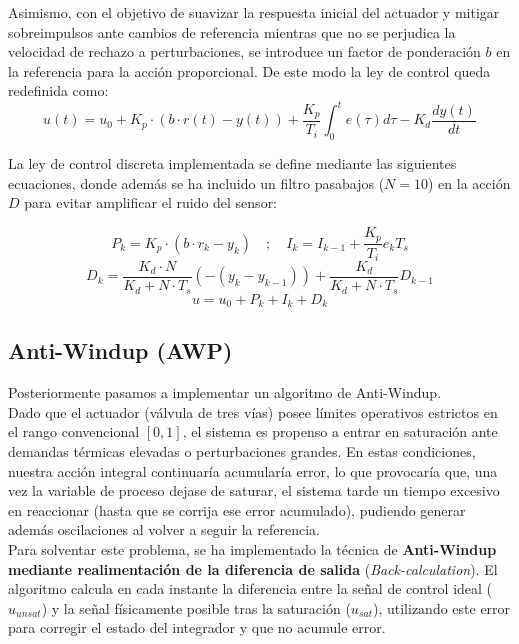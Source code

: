 	Asimismo, con el objetivo de suavizar la respuesta inicial del actuador y mitigar sobreimpulsos ante cambios de referencia mientras que no se perjudica la velocidad de rechazo a perturbaciones, se introduce un factor de ponderación $b$ en la referencia para la acción proporcional. De este modo la ley de control queda redefinida como: \\
	$$u(t) = u_0 + K_p \cdot (b \cdot r(t) - y(t)) + \frac{K_p}{T_i} \int_{0}^{t} e(\tau) d\tau - K_d \frac{dy(t)}{dt}$$
	
La ley de control discreta implementada se define mediante las siguientes ecuaciones, donde además se ha incluido un filtro pasabajos ($N=10$) en la acción $D$ para evitar amplificar el ruido del sensor:

\begin{equation}
	P_k = K_p \cdot (b \cdot r_k - y_k) \quad ; \quad I_k = I_{k-1} + \frac{K_p}{T_i} e_k T_s
\end{equation}
\begin{equation}
	D_k = \frac{K_d \cdot N}{K_d + N \cdot T_s} \left( - \left( y_k - y_{k-1} \right) \right) + \frac{K_d}{K_d + N \cdot T_s} D_{k-1}
\end{equation}
\begin{equation}
	u = u_0 + P_k + I_k + D_k
\end{equation}
	
	\subsection{Anti-Windup (AWP)}
	Posteriormente pasamos a implementar un algoritmo de Anti-Windup. \\
	
	Dado que el actuador (válvula de tres vías) posee límites operativos estrictos en el rango convencional $[0, 1]$, el sistema es propenso a entrar en saturación ante demandas térmicas elevadas o perturbaciones grandes. En estas condiciones, nuestra acción integral  continuaría acumularía error, lo que provocaría que, una vez la variable de proceso dejase de saturar, el sistema tarde un tiempo excesivo en reaccionar (hasta que se corrija ese error acumulado), pudiendo generar además oscilaciones al volver a seguir la referencia.\\
	
	Para solventar este problema, se ha implementado la técnica de \textbf{Anti-Windup mediante realimentación de la diferencia de salida} (\textit{Back-calculation}). El algoritmo calcula en cada instante la diferencia entre la señal de control ideal ($u_{unsat}$) y la señal físicamente posible tras la saturación ($u_{sat}$), utilizando este error para corregir el estado del integrador y que no acumule error.
	
